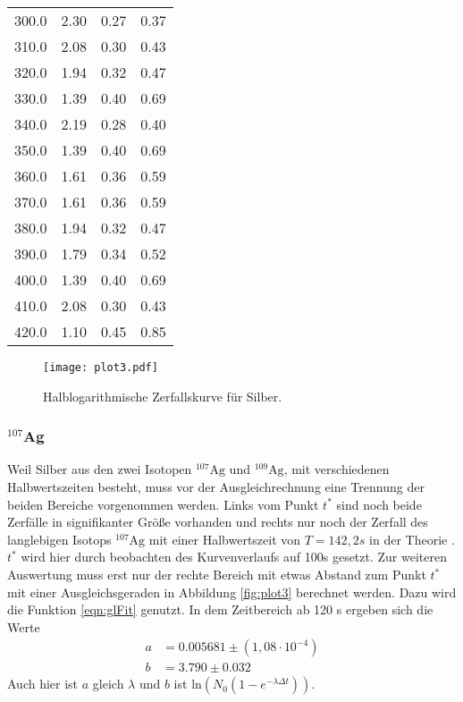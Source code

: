 \begin{table}
\begin{tabular}{c c c c}
  300.0 & 2.30 & 0.27 & 0.37 \\
  310.0 & 2.08 & 0.30 & 0.43 \\
  320.0 & 1.94 & 0.32 & 0.47 \\
  330.0 & 1.39 & 0.40 & 0.69 \\
  340.0 & 2.19 & 0.28 & 0.40 \\
  350.0 & 1.39 & 0.40 & 0.69 \\
  360.0 & 1.61 & 0.36 & 0.59 \\
  370.0 & 1.61 & 0.36 & 0.59 \\
  380.0 & 1.94 & 0.32 & 0.47 \\
  390.0 & 1.79 & 0.34 & 0.52 \\
  400.0 & 1.39 & 0.40 & 0.69 \\
  410.0 & 2.08 & 0.30 & 0.43 \\
  420.0 & 1.10 & 0.45 & 0.85 \\
  \bottomrule
\end{tabular}
\end{table}
\FloatBarrier

\begin{figure}
  \centering
  \texttt{[image: plot3.pdf]}
  \caption{Halblogarithmische Zerfallskurve für Silber.}
  \label{fig:plot2}
\end{figure}
\FloatBarrier

\subsubsection{$^{107}$Ag}

Weil Silber aus den zwei Isotopen $^{107}\text{Ag}$ und $^{109}\text{Ag}$, mit verschiedenen Halbwertszeiten besteht, muss vor der Ausgleichrechnung eine Trennung der beiden Bereiche vorgenommen werden.
Links vom Punkt $t^*$ sind noch beide Zerfälle in signifikanter Größe vorhanden und rechts nur noch der Zerfall des langlebigen Isotops $^{107}\text{Ag}$ mit einer Halbwertszeit von $T = 142,2 s$ in der Theorie \cite{Periode}.
$t^*$ wird hier durch beobachten des Kurvenverlaufs auf 100s gesetzt.
Zur weiteren Auswertung muss erst nur der rechte Bereich mit etwas Abstand zum Punkt $t^*$ mit einer Ausgleichsgeraden in Abbildung \ref{fig:plot3} berechnet werden.
Dazu wird die Funktion \ref{eqn:glFit} genutzt.
In dem Zeitbereich ab 120 s ergeben sich die Werte
\begin{align*}
  a &=  0.005681 \pm (1,08 \cdot 10^{-4}) \\
  b &= 3.790 \pm 0.032
\end{align*}
Auch hier ist $a$ gleich $\lambda$ und $b$ ist $\text{ln}(N_0(1-e^{-\lambda \Delta t}))$.

